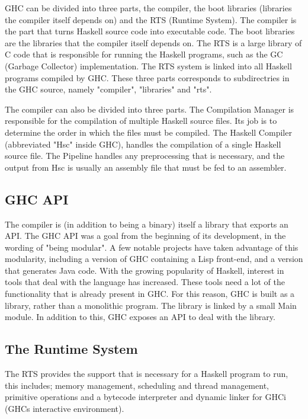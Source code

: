 GHC can be divided into three parts, the compiler, the boot libraries
(libraries the compiler itself depends on) and the RTS (Runtime System). 
The compiler is the part
that turns Haskell source code into executable code. The boot libraries are the 
libraries that the compiler itself depends on. The RTS is a large library
of C code that is responsible for running the Haskell programs, such as the 
GC (Garbage Collector) implementation. The RTS system is linked into all 
Haskell programs compiled by GHC. These three parts corresponds to subdirectries
in the GHC source, namely "compiler", "libraries" and "rts".
\cite{marlow2012glasgow}

The compiler can also be divided into three parts. The Compilation Manager is 
responsible for the compilation of multiple Haskell source files. Its job is to
determine the order in which the files must be compiled. The Haskell Compiler 
(abbreviated "Hsc" inside GHC), handles the compilation of a single Haskell source
file. The Pipeline handles any preprocessing that is necessary, and the output
from Hsc is usually an assembly file that must be fed to an assembler.
\cite{marlow2012glasgow}


\subsection*{GHC API}

The compiler is (in addition to being a binary) itself a library that exports an API.
The GHC API was a goal from the beginning of its development, in the wording of
"being modular". A few notable projects have taken advantage of this modularity,
including a version of GHC containing a Lisp front-end, and a version that generates
Java code. With the growing popularity of Haskell, interest in tools that deal with
the language has increased. These tools need a lot of the functionality that is already
present in GHC. For this reason, GHC is built as a library, rather than a monolithic
program. The library is linked by a small Main module. In addition to this, GHC
exposes an API to deal with the library.\cite{marlow2012glasgow} 

\subsection*{The Runtime System}

The RTS provides the support that is necessary for a Haskell program to run, this
includes; memory management, scheduling and thread management, primitive operations
and a bytecode interpreter and dynamic linker for GHCi (GHCs interactive environment).
\cite{marlow2012glasgow} 

